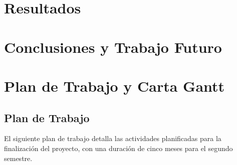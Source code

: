 \documentclass[final,letterpaper,oneside,authoryear,11pt,singlespace,spanish]{ezthesis}
\begin{document}
\chapter{Resultados}  \label{cap:aplicacion}


\chapter{Conclusiones y Trabajo Futuro} \label{cap:conclusion}



% 






\appendix

\chapter{Plan de Trabajo y Carta Gantt}
\section{Plan de Trabajo}
\label{sec:plan_trabajo}

El siguiente plan de trabajo detalla las actividades planificadas para la finalización del proyecto, con una duración de cinco meses para el segundo semestre.
\end{document}
